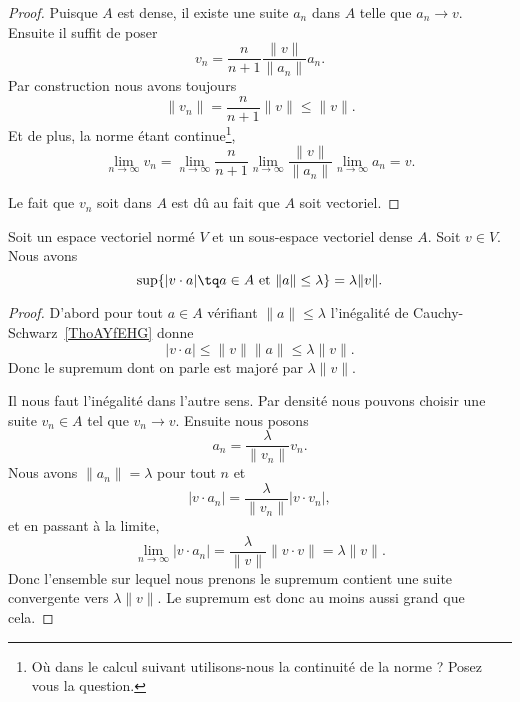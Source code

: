 \begin{proof}
	Puisque \( A\) est dense, il existe une suite \( a_n\) dans \( A\) telle que \( a_n\to v\). Ensuite il suffit de poser
	\begin{equation}
		v_n=\frac{ n }{ n+1 }\frac{ \| v \| }{ \| a_n \| }a_n.
	\end{equation}
	Par construction nous avons toujours
	\begin{equation}
		\| v_n \|=\frac{ n }{ n+1 }\| v \|\leq \| v \|.
	\end{equation}
	Et de plus, la norme étant continue\footnote{Où dans le calcul suivant utilisons-nous la continuité de la norme ? Posez vous la question.},
	\begin{equation}
		\lim_{n\to \infty} v_n=\lim_{n\to \infty} \frac{ n }{ n+1 }\lim_{n\to \infty} \frac{ \| v \| }{ \| a_n \| }\lim_{n\to \infty} a_n=v.
	\end{equation}

	Le fait que \( v_n\) soit dans \( A\) est dû au fait que \( A\) soit vectoriel.
\end{proof}

\begin{proposition}     \label{PROPooVEMGooYKhMFy}
	Soit un espace vectoriel normé \( V\) et un sous-espace vectoriel dense \( A\). Soit \( v\in V\). Nous avons
	\begin{equation}
		\sup\{ | v\cdot a |\tq a\in A\text{ et }\| a \|\leq \lambda \}=\lambda\| v \|.
	\end{equation}
\end{proposition}

\begin{proof}
	D'abord pour tout \( a\in A\) vérifiant \( \| a \|\leq \lambda\) l'inégalité de Cauchy-Schwarz~\ref{ThoAYfEHG} donne
	\begin{equation}
		| v\cdot a |\leq \| v \|\| a \|\leq \lambda\| v \|.
	\end{equation}
	Donc le supremum dont on parle est majoré par \( \lambda\| v \|\).

	Il nous faut l'inégalité dans l'autre sens. Par densité nous pouvons choisir une suite \( v_n\in A\) tel que \( v_n\to v\). Ensuite nous posons
	\begin{equation}
		a_n=\frac{ \lambda }{ \| v_n \| }v_n.
	\end{equation}
	Nous avons \( \| a_n \|=\lambda\) pour tout \( n\) et
	\begin{equation}
		| v\cdot a_n |=\frac{ \lambda }{ \| v_n \| }| v\cdot v_n |,
	\end{equation}
	et en passant à la limite,
	\begin{equation}
		\lim_{n\to \infty} | v\cdot a_n |=\frac{ \lambda }{ \| v \| }\| v\cdot v \|=\lambda\| v \|.
	\end{equation}
	Donc l'ensemble sur lequel nous prenons le supremum contient une suite convergente vers \( \lambda\| v \|\). Le supremum est donc au moins aussi grand que cela.
\end{proof}

